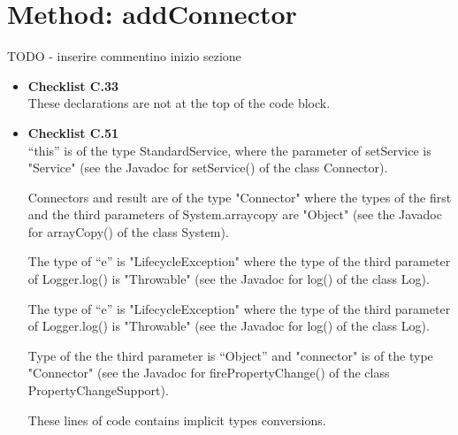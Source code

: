 \documentclass[../../../../codeInspection.tex]{subfiles}
\begin{document}
	\section{Method: addConnector}

		TODO - inserire commentino inizio sezione

		\begin{itemize}
			\item \textbf{Checklist C.33} \\

				  

				  These declarations are not at the top of the code block.

			\item \textbf{Checklist C.51} \\

				  

				  “this” is of the type StandardService, where the parameter of setService is "Service"
				  (see the Javadoc for setService() of the class Connector).

				  

				  Connectors and result are of the type "Connector" where the types of the first and the third parameters of System.arraycopy are "Object" (see the Javadoc for arrayCopy() of the class System).

				  

				  The type of “e” is "LifecycleException" where the type of the third parameter of Logger.log() is "Throwable" (see the Javadoc for log() of the class Log).

				  

				  The type of “e” is "LifecycleException" where the type of the third parameter of Logger.log() is "Throwable" (see the Javadoc for log() of the class Log).

				  

				  Type of the the third parameter is “Object” and "connector" is of the type "Connector" (see the Javadoc for firePropertyChange() of the class PropertyChangeSupport).

				  These lines of code contains implicit types conversions.

		\end{itemize}
\end{document}
